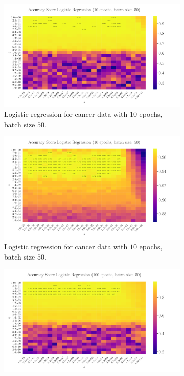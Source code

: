 \documentclass[%
reprint,s
amsmath,amssymb,
aps,
]{revtex4-2}
\begin{document}
\begin{figure}
	\begin{subfigure}{0.41\textwidth}
		\includegraphics[width=\textwidth]{Figures/LogReg25x25_epoch10_batchS50.pdf}
		\caption{Logistic regression for cancer data with \(10\) epochs, batch size \(50\).}
		\label{fig:LogReg25x25_epoch10_bacthS50}
	\end{subfigure}
	\hfill
	\begin{subfigure}{0.41\textwidth}
		\includegraphics[width=\textwidth]{Figures/LogReg25x25_epoch10_batchS50_zoomed.pdf}
		\caption{Logistic regression for cancer data with \(10\) epochs, batch size \(50\).}
		\label{fig:LogReg25x25_epoch10_bacthS50_zoomed}
	\end{subfigure}
\hfill\newline
	\begin{subfigure}{0.41\textwidth}
		\includegraphics[width=\textwidth]{Figures/LogReg25x25_epoch100_batchS50.pdf}

\end{subfigure}
\end{figure}
\end{document}
